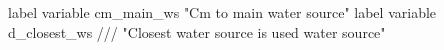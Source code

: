label variable cm_main_ws "Cm to main water source"
label variable d_closest_ws ///
"Closest water source is used water source" 
